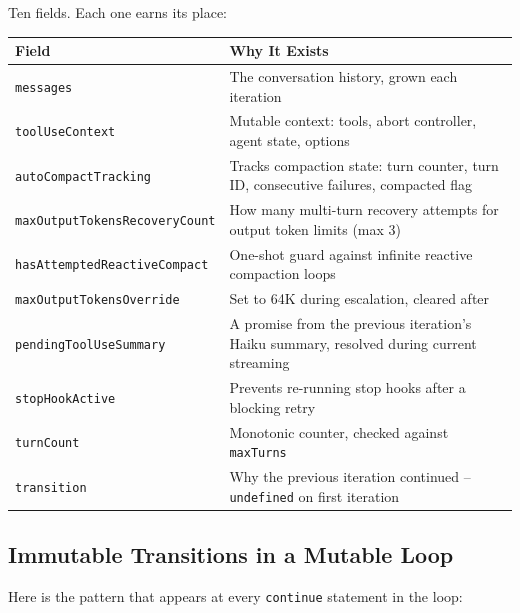\documentclass[
  english,
  11pt,
  letterpaper,
]{book}
\begin{document}
Ten fields. Each one earns its place:

\begin{longtable}[]{@{}
  >{\raggedright\arraybackslash}p{}
  >{\raggedright\arraybackslash}p{}@{}}
\toprule\noalign{}
\begin{minipage}[b]{\linewidth}\raggedright
Field
\end{minipage} & \begin{minipage}[b]{\linewidth}\raggedright
Why It Exists
\end{minipage} \\
\midrule\noalign{}
\endhead
\bottomrule\noalign{}
\endlastfoot
\texttt{messages} & The conversation history, grown each iteration \\
\texttt{toolUseContext} & Mutable context: tools, abort controller,
agent state, options \\
\texttt{autoCompactTracking} & Tracks compaction state: turn counter,
turn ID, consecutive failures, compacted flag \\
\texttt{maxOutputTokensRecoveryCount} & How many multi-turn recovery
attempts for output token limits (max 3) \\
\texttt{hasAttemptedReactiveCompact} & One-shot guard against infinite
reactive compaction loops \\
\texttt{maxOutputTokensOverride} & Set to 64K during escalation, cleared
after \\
\texttt{pendingToolUseSummary} & A promise from the previous iteration's
Haiku summary, resolved during current streaming \\
\texttt{stopHookActive} & Prevents re-running stop hooks after a
blocking retry \\
\texttt{turnCount} & Monotonic counter, checked against
\texttt{maxTurns} \\
\texttt{transition} & Why the previous iteration continued --
\texttt{undefined} on first iteration \\
\end{longtable}

\subsection{Immutable Transitions in a Mutable
Loop}\label{immutable-transitions-in-a-mutable-loop}

Here is the pattern that appears at every \texttt{continue} statement in
the loop:
\end{document}
